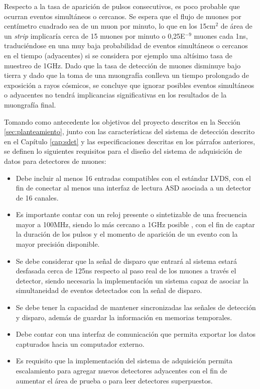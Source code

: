 	Respecto a la tasa de aparición de pulsos consecutivos, es poco probable que ocurran eventos simultáneos o cercanos. Se espera que el flujo de muones por centímetro cuadrado sea de un muon por minuto\cite{Rocca2018CosmicUs}, lo que en los 15cm$^2$ de área de un \textit{strip} implicaría cerca de 15 muones por minuto o 0,25E$^{-9}$ muones cada 1ns, traduciéndose en una muy baja probabilidad de eventos simultáneos o cercanos en el tiempo (adyacentes) si se considera por ejemplo una altísimo tasa de muestreo de 1GHz. Dado que la tasa de detección de muones disminuye bajo tierra y dado que la toma de una muongrafía conlleva un tiempo prolongado de exposición a rayos cósmicos, se concluye que ignorar posibles eventos simultáneos o adyacentes no tendrá implicancias significativas en los resultados de la muongrafía final. 
	
	Tomando como antecedente los objetivos del proyecto descritos en la Sección \ref{sec:planteamiento}, junto con las características del sistema de detección descrito en el Capítulo \ref{cap:sdet} y las especificaciones descritas en los párrafos anteriores, se definen lo siguientes requisitos para el diseño del sistema de adquisición de datos para detectores de muones:
	
	\begin{itemize}
		\item Debe incluir al menos 16 entradas compatibles con el estándar LVDS, con el fin de conectar al menos una interfaz de lectura ASD asociada a un detector de 16 canales.
		\item Es importante contar con un reloj presente o sintetizable de una frecuencia mayor a 100MHz, siendo lo más cercano a 1GHz posible , con el fin de captar la duración de los pulsos y el momento de aparición de un evento con la mayor precisión disponible.
		\item Se debe considerar que la señal de disparo que entrará al sistema estará desfasada cerca de 125ns\cite{Oyanadel2020SistemaSTGC} respecto al paso real de los muones a través el detector, siendo necesaria la implementación un sistema capaz de asociar la simultaneidad de eventos detectados con la señal de disparo.
		\item  Se debe tener la capacidad de mantener sincronizadas las señales de detección y disparo, además de guardar la información en memorias temporales.
		\item Debe contar con una interfaz de comunicación que permita exportar los datos capturados hacia un computador externo.
		\item Es requisito que la implementación del sistema de adquisición permita escalamiento para agregar nuevos detectores adyacentes con el fin de aumentar el área de prueba o para leer detectores superpuestos.
	\end{itemize}
	
